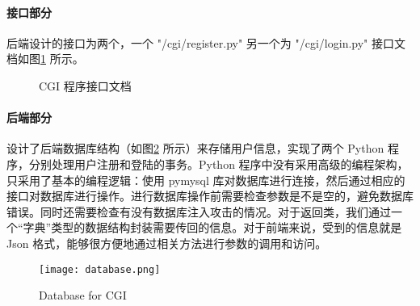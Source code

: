 \paragraph*{接口部分} 后端设计的接口为两个，一个 "/cgi/register.py" 另一个为 "/cgi/login.py" 接口文档如图\ref{fig:CGIPORT} 所示。

\begin{figure}[htbp!]
    \centering
    \caption{CGI 程序接口文档} \label{fig:CGIPORT}
\end{figure}


\paragraph*{后端部分} 设计了后端数据库结构（如图\ref{fig:database} 所示）来存储用户信息，实现了两个 Python 程序，分别处理用户注册和登陆的事务。Python 程序中没有采用高级的编程架构，只采用了基本的编程逻辑：使用 pymysql 库对数据库进行连接，然后通过相应的接口对数据库进行操作。进行数据库操作前需要检查参数是不是空的，避免数据库错误。同时还需要检查有没有数据库注入攻击的情况。对于返回类，我们通过一个“字典”类型的数据结构封装需要传回的信息。对于前端来说，受到的信息就是 Json 格式，能够很方便地通过相关方法进行参数的调用和访问。

\begin{figure}[htbp!]
    \centering
    \texttt{[image: database.png]}
    \caption{Database for CGI}\label{fig:database}
\end{figure}
